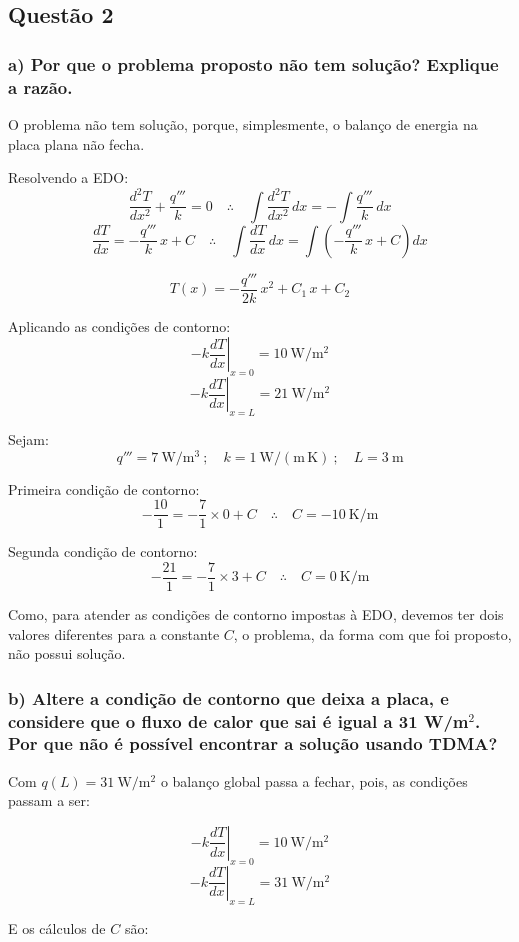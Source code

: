 \subsection*{Questão 2}
\subsubsection*{a) Por que o problema proposto não tem solução? Explique a razão.}
 
O problema não tem solução, porque, simplesmente, o balanço de energia na
placa plana não fecha.
 
Resolvendo a EDO:
\[
  \frac{d^{2}T}{dx^{2}}+\frac{q'''}{k}=0
  \quad\therefore\quad
  \int \frac{d^{2}T}{dx^{2}}\,dx = -\int \frac{q'''}{k}\,dx
\]
\[
  \frac{dT}{dx}=-\frac{q'''}{k}\,x+C
  \quad\therefore\quad
  \int \frac{dT}{dx}\,dx = \int\left(-\frac{q'''}{k}\,x+C\right)dx
\]

\[T(x)=-\frac{q'''}{2k}\,x^{2}+C_1\,x+C_2\]
 
Aplicando as condições de contorno:
\[
  -k\left.\frac{dT}{dx}\right|_{x=0}=10\ \mathrm{W/m^{2}}
\]
\[
  -k\left.\frac{dT}{dx}\right|_{x=L}=21\ \mathrm{W/m^{2}}
\]
 
Sejam:
\[
  q'''=7\ \mathrm{W/m^{3}}\ ;\quad k=1\ \mathrm{W/(m\,K)}\ ;\quad L=3\ \mathrm{m}
\]
 
Primeira condição de contorno:
\[
  -\frac{10}{1}=-\frac{7}{1}\times 0+C
  \quad\therefore\quad
  C=-10\ \mathrm{K/m}
\]
 
Segunda condição de contorno:
\[
  -\frac{21}{1}=-\frac{7}{1}\times 3+C
  \quad\therefore\quad
  C=0\ \mathrm{K/m}
\]
 
Como, para atender as condições de contorno impostas à EDO, devemos ter dois
valores diferentes para a constante $C$, o problema, da forma com que foi
proposto, não possui solução.

\subsubsection*{b) Altere a condição de contorno que deixa a placa, e considere
que o fluxo de calor que sai é igual a 31 W/m$^2$. Por que não é possível
encontrar a solução usando TDMA?}

Com $q(L)=31\ \mathrm{W/m^2}$ o balanço global passa a fechar, pois, as condições passam a ser:

\[
  -k\left.\frac{dT}{dx}\right|_{x=0}=10\ \mathrm{W/m^{2}}
\]
\[
  -k\left.\frac{dT}{dx}\right|_{x=L}=31\ \mathrm{W/m^{2}}
\]

E os cálculos de $C$ são: 


